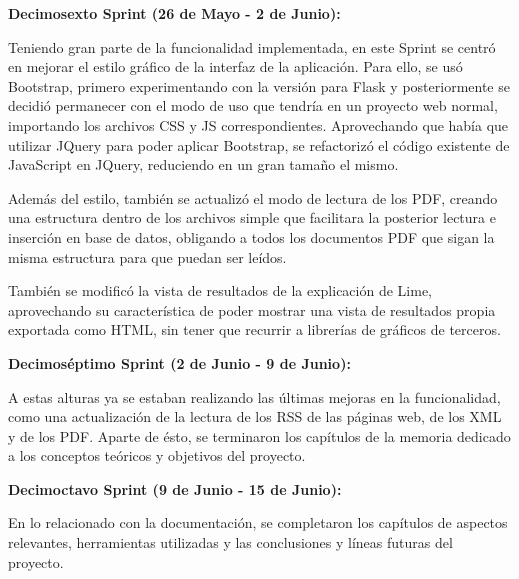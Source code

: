 

\textbf{Decimosexto Sprint (26 de Mayo - 2 de Junio):}

Teniendo gran parte de la funcionalidad implementada, en este Sprint se centró en mejorar el estilo gráfico de la interfaz de la aplicación. Para ello, se usó Bootstrap, primero experimentando con la versión para Flask y posteriormente se decidió permanecer con el modo de uso que tendría en un proyecto web normal, importando los archivos CSS y JS correspondientes. Aprovechando que había que utilizar JQuery para poder aplicar Bootstrap, se refactorizó el código existente de JavaScript en JQuery, reduciendo en un gran tamaño el mismo.

Además del estilo, también se actualizó el modo de lectura de los PDF, creando una estructura dentro de los archivos simple que facilitara la posterior lectura e inserción en base de datos, obligando a todos los documentos PDF que sigan la misma estructura para que puedan ser leídos. 

También se modificó la vista de resultados de la explicación de Lime, aprovechando su característica de poder mostrar una vista de resultados propia exportada como HTML, sin tener que recurrir a librerías de gráficos de terceros.



\textbf{Decimoséptimo Sprint (2 de Junio - 9 de Junio):}

A estas alturas ya se estaban realizando las últimas mejoras en la funcionalidad, como una actualización de la lectura de los RSS de las páginas web, de los XML y de los PDF. Aparte de ésto, se terminaron los capítulos de la memoria dedicado a los conceptos teóricos y objetivos del proyecto.



\textbf{Decimoctavo Sprint (9 de Junio - 15 de Junio):}

En lo relacionado con la documentación, se completaron los capítulos de aspectos relevantes, herramientas utilizadas y las conclusiones y líneas futuras del proyecto.

